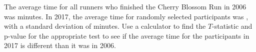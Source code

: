 \begin{exercisewrap}
\begin{nexercise}
The average time for all runners who finished the Cherry Blossom Run in 2006 was \cherryblossomnull{} minutes. In 2017, the average time for \cherryblossomn{} randomly selected participants was \cherryblossommean{}, with a standard deviation of \cherryblossomsd{} minutes. Use a calculator to find the $T$-statistic and p-value for the appropriate test to see if the average time for the participants in 2017 is different than it was in 2006.\footnotemark
\end{nexercise}
\end{exercisewrap}



\D{\newpage}

